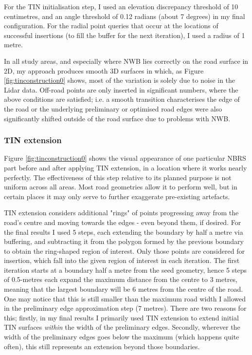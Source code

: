 For the TIN initialisation step, I used an elevation discrepancy threshold of 10 centimetres, and an angle threshold of 0.12 radians (about 7 degrees) in my final configuration. For the radial point queries that occur at the locations of successful insertions (to fill the buffer for the next iteration), I used a radius of 1 metre.

In all study areas, and especially where NWB lies correctly on the road surface in 2D, my approach produces smooth 3D surfaces in which, as Figure \ref{fig:tinconstruction0} shows, most of the variation is solely due to noise in the Lidar data. Off-road points are only inserted in significant numbers, where the above conditions are satisfied; i.e. a smooth transition characterises the edge of the road or the underlying preliminary or optimised road edges were also significantly shifted outside of the road surface due to problems with NWB.

\subsubsection{TIN extension}

Figure \ref{fig:tinconstruction0} shows the visual appearance of one particular NBRS part before and after applying TIN extension, in a location where it works nearly perfectly. The effectiveness of this step relative to its planned purpose is not uniform across all areas. Most road geometries allow it to perform well, but in certain places it may only serve to further exaggerate pre-existing artefacts.

TIN extension considers additional "rings" of points progressing away from the road's centre and moving towards the edges - even beyond them, if desired. For the final results I used 5 steps, each extending the boundary by half a metre via buffering, and subtracting it from the polygon formed by the previous boundary to obtain the ring-shaped region of interest. Only those points are considered for insertion, which fall into the given region of interest in each iteration. The first iteration starts at a boundary half a metre from the seed geometry, hence 5 steps of 0.5-metres each expand the maximum distance from the centre to 3 metres, meaning that the largest boundary will be 6 metres from the centre of the road. One may notice that this is still smaller than the maximum road width I allowed in the preliminary edge approximation step (7 metres). There are two reasons for this; firstly, in my final results I primarily used TIN extension to extend initial TIN surfaces \textit{within} the width of the preliminary edges. Secondly, wherever the width of the preliminary edges goes below the maximum (which happens quite often), this still represents an extension beyond those boundaries.


